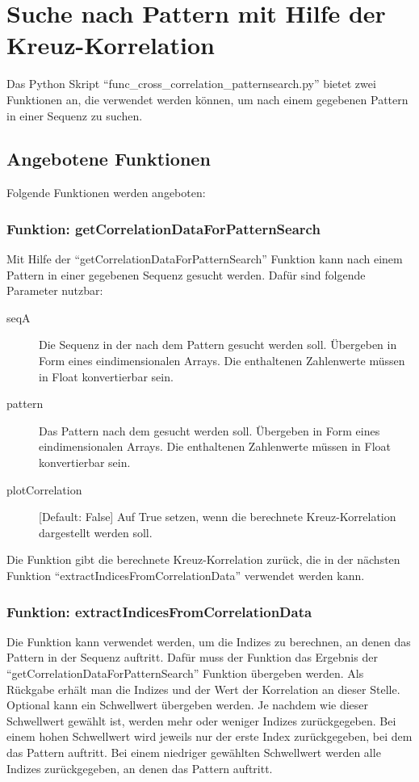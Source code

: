 \chapter{Suche nach Pattern mit Hilfe der Kreuz-Korrelation}
Das Python Skript \enquote{func\_cross\_correlation\_patternsearch.py} bietet zwei Funktionen an, die verwendet werden können, 
um nach einem gegebenen Pattern in einer Sequenz zu suchen.

\section{Angebotene Funktionen}
Folgende Funktionen werden angeboten:

\subsection{Funktion: getCorrelationDataForPatternSearch}
Mit Hilfe der \enquote{getCorrelationDataForPatternSearch} Funktion kann nach einem Pattern in einer gegebenen Sequenz gesucht werden. Dafür sind folgende Parameter nutzbar:
\begin{description}
    \item[seqA] Die Sequenz in der nach dem Pattern gesucht werden soll. Übergeben in Form eines eindimensionalen Arrays. Die enthaltenen Zahlenwerte müssen in Float konvertierbar sein.
    \item[pattern] Das Pattern nach dem gesucht werden soll. Übergeben in Form eines eindimensionalen Arrays. Die enthaltenen Zahlenwerte müssen in Float konvertierbar sein.
    \item[plotCorrelation] [Default: False] Auf True setzen, wenn die berechnete Kreuz-Korrelation dargestellt werden soll.
\end{description}
Die Funktion gibt die berechnete Kreuz-Korrelation zurück, die in der nächsten Funktion \enquote{extractIndicesFromCorrelationData} verwendet werden kann.

\subsection{Funktion: extractIndicesFromCorrelationData}
Die Funktion kann verwendet werden, um die Indizes zu berechnen, an denen das Pattern in der Sequenz auftritt. Dafür muss der Funktion das Ergebnis der \enquote{getCorrelationDataForPatternSearch} Funktion
übergeben werden. Als Rückgabe erhält man die Indizes und der Wert der Korrelation an dieser Stelle.\\
Optional kann ein Schwellwert übergeben werden. Je nachdem wie dieser Schwellwert gewählt ist, werden mehr oder weniger Indizes zurückgegeben. Bei einem hohen Schwellwert wird 
jeweils nur der erste Index zurückgegeben, bei dem das Pattern auftritt. Bei einem niedriger gewählten Schwellwert werden alle Indizes zurückgegeben, an denen das Pattern auftritt. 

